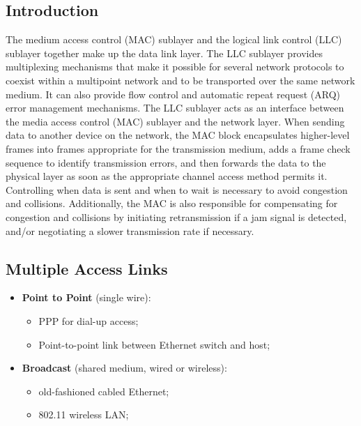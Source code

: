 \documentclass[../resumosRCOM.tex]{subfiles}
\begin{document}
 
\subsection{Introduction}
The medium access control (MAC) sublayer and the logical link control (LLC) sublayer together make up the data link layer.
\newline
\newline
The LLC sublayer provides multiplexing mechanisms that make it possible for several network protocols to coexist within a multipoint network and to be transported over the same network medium. It can also provide flow control and automatic repeat request (ARQ) error management mechanisms.
The LLC sublayer acts as an interface between the media access control (MAC) sublayer and the network layer.
\newline
\newline
When sending data to another device on the network, the MAC block encapsulates higher-level frames into frames appropriate for the transmission medium, adds a frame check sequence to identify transmission errors, and then forwards the data to the physical layer as soon as the appropriate channel access method permits it. Controlling when data is sent and when to wait is necessary to avoid congestion and collisions. Additionally, the MAC is also responsible for compensating for congestion and collisions by initiating retransmission if a jam signal is detected, and/or negotiating a slower transmission rate if necessary.
\newline
\subsection{Multiple Access Links}
\begin{itemize}
    \item \textbf {Point to Point} (single wire):
    \begin{itemize}
        \item PPP for dial-up access;
        \item Point-to-point link between Ethernet switch and host;
    \end{itemize}
    \item \textbf {Broadcast} (shared medium, wired or wireless):
    \begin{itemize}
        \item old-fashioned cabled Ethernet;
        \item 802.11 wireless LAN;
    \end{itemize}
\end{itemize}
\end{document}

